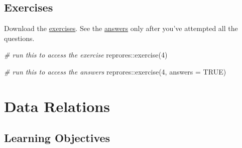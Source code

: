\documentclass[
  oneside]{book}
\newenvironment{Shaded}{\begin{snugshade}}{\end{snugshade}}
\newcommand{\AttributeTok}[1]{\textcolor[rgb]{0.77,0.63,0.00}{#1}}
\newcommand{\CommentTok}[1]{\textcolor[rgb]{0.56,0.35,0.01}{\textit{#1}}}
\newcommand{\ConstantTok}[1]{\textcolor[rgb]{0.00,0.00,0.00}{#1}}
\newcommand{\DecValTok}[1]{\textcolor[rgb]{0.00,0.00,0.81}{#1}}
\newcommand{\FunctionTok}[1]{\textcolor[rgb]{0.00,0.00,0.00}{#1}}
\newcommand{\NormalTok}[1]{#1}
\newcommand{\SpecialCharTok}[1]{\textcolor[rgb]{0.00,0.00,0.00}{#1}}
\begin{document}
\hypertarget{exercises-data}{%
\section{Exercises}\label{exercises-data}}

Download the \href{exercises/04_data_exercise.Rmd}{exercises}. See the \href{exercises/04_data_answers.Rmd}{answers} only after you've attempted all the questions.

\begin{Shaded}
\begin{Highlighting}[]
\CommentTok{\# run this to access the exercise}
\NormalTok{reprores}\SpecialCharTok{::}\FunctionTok{exercise}\NormalTok{(}\DecValTok{4}\NormalTok{)}

\CommentTok{\# run this to access the answers}
\NormalTok{reprores}\SpecialCharTok{::}\FunctionTok{exercise}\NormalTok{(}\DecValTok{4}\NormalTok{, }\AttributeTok{answers =} \ConstantTok{TRUE}\NormalTok{)}
\end{Highlighting}
\end{Shaded}

\hypertarget{joins}{%
\chapter{Data Relations}\label{joins}}

\hypertarget{ilo-joins}{%
\section{Learning Objectives}\label{ilo-joins}}
\end{document}
